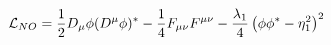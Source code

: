 \begin{equation}
{\cal L}_{NO}=\frac{1}{2}D_{\mu} \phi (D^{\mu} \phi)^*-\frac{1}{4} F_{\mu\nu} F^{\mu\nu}
-\frac{\lambda_1}{4}\left(\phi\phi^*-\eta^2_1\right)^2
\end{equation} 
